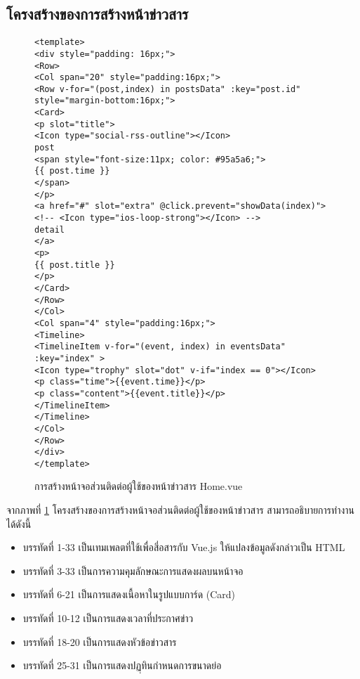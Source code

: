 	\subsection{โครงสร้างของการสร้างหน้าข่าวสาร}
	\begin{figure}[H]
		{\begin{lstlisting}
<template>
<div style="padding: 16px;">
<Row>
<Col span="20" style="padding:16px;">
<Row v-for="(post,index) in postsData" :key="post.id" style="margin-bottom:16px;"> 
<Card>
<p slot="title">
<Icon type="social-rss-outline"></Icon>
post 
<span style="font-size:11px; color: #95a5a6;"> 
{{ post.time }}
</span>
</p>
<a href="#" slot="extra" @click.prevent="showData(index)">
<!-- <Icon type="ios-loop-strong"></Icon> -->
detail
</a>
<p>
{{ post.title }}
</p>
</Card>           
</Row>
</Col>
<Col span="4" style="padding:16px;">
<Timeline>
<TimelineItem v-for="(event, index) in eventsData" :key="index" >
<Icon type="trophy" slot="dot" v-if="index == 0"></Icon>
<p class="time">{{event.time}}</p>
<p class="content">{{event.title}}</p>
</TimelineItem>
</Timeline>
</Col>
</Row>
</div>
</template>
			\end{lstlisting}}
		\caption{การสร้างหน้าจอส่วนติดต่อผู้ใช้ของหน้าข่าวสาร Home.vue}
		\label{Fig:Home}
	\end{figure}
	จากภาพที่ \ref{Fig:Home} โครงสร้างของการสร้างหน้าจอส่วนติดต่อผู้ใช้ของหน้าข่าวสาร  สามารถอธิบายการทำงานได้ดังนี้
	\begin{itemize}[label={--}]
		\item บรรทัดที่ 1-33  เป็นเทมเพลตที่ใช้เพื่อสี่อสารกับ Vue.js ให้แปลงข้อมูลดังกล่าวเป็น HTML
		\item บรรทัดที่ 3-33 	    เป็นการความคุมลักษณะการแสดงผลบนหน้าจอ
		\item บรรทัดที่ 6-21 เป็นการแสดงเนื้อหาในรูปแบบการ์ด (Card)
		\item บรรทัดที่ 10-12 เป็นการแสดงเวลาที่ประกาศข่าว
		\item บรรทัดที่ 18-20 เป็นการแสดงหัวข้อข่าวสาร
		\item บรรทัดที่ 25-31 เป็นการแสดงปฏฺทินกำหนดการขนาดย่อ
	\end{itemize}
	
